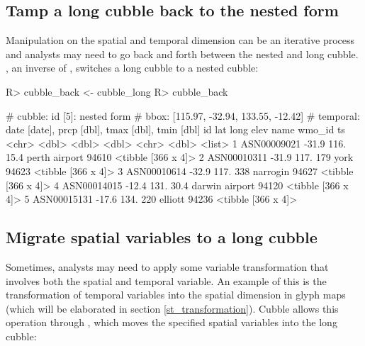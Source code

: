 \documentclass[
]{jss}
\begin{document}
\hypertarget{tamp-a-long-cubble-back-to-the-nested-form}{%
\subsection{Tamp a long cubble back to the nested
form}\label{tamp-a-long-cubble-back-to-the-nested-form}}

Manipulation on the spatial and temporal dimension can be an iterative
process and analysts may need to go back and forth between the nested
and long cubble. , an inverse of , switches
a long cubble to a nested cubble:

\begin{CodeChunk}
\begin{CodeInput}
R> cubble_back <- cubble_long %
R> cubble_back
\end{CodeInput}
\begin{CodeOutput}
# cubble:   id [5]: nested form
# bbox:     [115.97, -32.94, 133.55, -12.42]
# temporal: date [date], prcp [dbl], tmax [dbl], tmin [dbl]
  id            lat  long  elev name           wmo_id ts                
  <chr>       <dbl> <dbl> <dbl> <chr>           <dbl> <list>            
1 ASN00009021 -31.9  116.  15.4 perth airport   94610 <tibble [366 x 4]>
2 ASN00010311 -31.9  117. 179   york            94623 <tibble [366 x 4]>
3 ASN00010614 -32.9  117. 338   narrogin        94627 <tibble [366 x 4]>
4 ASN00014015 -12.4  131.  30.4 darwin airport  94120 <tibble [366 x 4]>
5 ASN00015131 -17.6  134. 220   elliott         94236 <tibble [366 x 4]>
\end{CodeOutput}
\end{CodeChunk}

\hypertarget{migrate-spatial-variables-to-a-long-cubble}{%
\subsection{Migrate spatial variables to a long
cubble}\label{migrate-spatial-variables-to-a-long-cubble}}

Sometimes, analysts may need to apply some variable transformation that
involves both the spatial and temporal variable. An example of this is
the transformation of temporal variables into the spatial dimension in
glyph maps (which will be elaborated in section
\ref{st_transformation}). Cubble allows this operation through
, which moves the specified spatial variables into the
long cubble:
\end{document}
